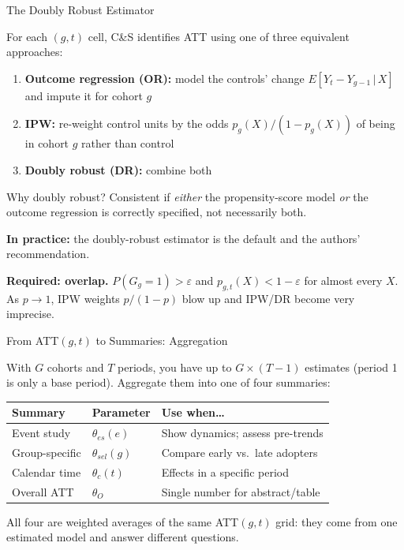 \documentclass[main.tex]{subfiles}
\begin{document}
\begin{frame}{The Doubly Robust Estimator}

  For each $(g, t)$ cell, C\&S identifies ATT using one of three
  equivalent approaches:

  \begin{enumerate}
    \item \textbf{Outcome regression (OR):} model the controls' change
      $E[Y_t - Y_{g-1}\,|\,X]$ and impute it for cohort $g$
    \item \textbf{IPW:} re-weight control units by the odds
      $p_g(X)/(1-p_g(X))$ of being in cohort $g$ rather than control
    \item \textbf{Doubly robust (DR):} combine both
  \end{enumerate}

  \medskip
  \begin{alertblock}{Why doubly robust?}
    Consistent if \emph{either} the propensity-score model \emph{or} the
    outcome regression is correctly specified, not necessarily both.
  \end{alertblock}

  \medskip
  \textbf{In practice:} the doubly-robust estimator is the default
  and the authors' recommendation.

  \smallskip
  \textbf{Required: overlap.} $P(G_g{=}1) > \varepsilon$ and
  $p_{g,t}(X) < 1{-}\varepsilon$ for almost every $X$. As $p \to 1$,
  IPW weights $p/(1{-}p)$ blow up and IPW/DR become very imprecise.

\end{frame}

\begin{frame}{From ATT$(g,t)$ to Summaries: Aggregation}

  With $G$ cohorts and $T$ periods, you have up to $G \times (T{-}1)$
  estimates (period 1 is only a base period).
  Aggregate them into one of four summaries:

  \bigskip
  \begin{tabular}{lll}
    \toprule
    \textbf{Summary} & \textbf{Parameter} & \textbf{Use when\ldots} \\
    \midrule
    Event study & $\theta_{es}(e)$ &
      Show dynamics; assess pre-trends \\
    \addlinespace
    Group-specific & $\theta_{sel}(g)$ &
      Compare early vs.\ late adopters \\
    \addlinespace
    Calendar time & $\theta_{c}(t)$ &
      Effects in a specific period \\
    \addlinespace
    Overall ATT & $\theta_O$ &
      Single number for abstract/table \\
    \bottomrule
  \end{tabular}

  \bigskip
  All four are weighted averages of the same ATT$(g,t)$ grid:
  they come from one estimated model and answer different questions.

\end{frame}
\end{document}
